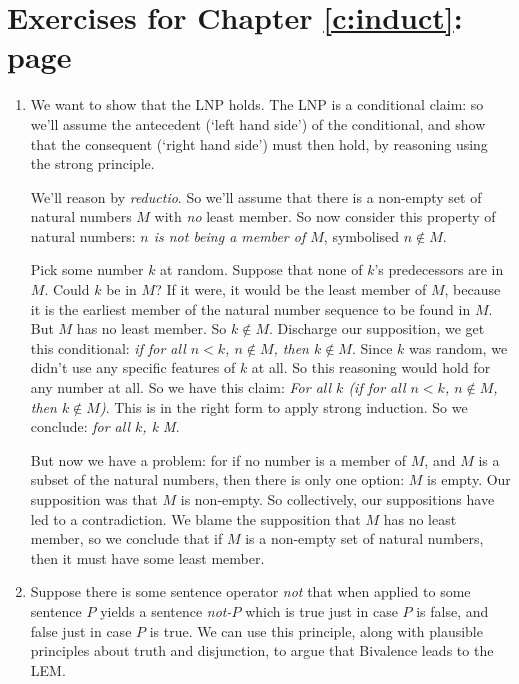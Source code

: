 
\section*{Exercises for Chapter \ref{c:induct}: page \pageref{ex:induct}} \label{ans:induct}

{\small
\begin{enumerate}
	\item We want to show that the LNP holds. The LNP is a conditional claim: so we'll assume the antecedent (`left hand side') of the conditional, and show that the consequent (`right hand side') must then hold, by reasoning using the strong principle.

	We'll reason by \emph{reductio}. So we'll assume that there is a non-empty set of natural numbers $M$ with \emph{no} least member. So now consider this property of natural numbers: \emph{$n$ is not being a member of $M$}, symbolised $n \notin M$.

	Pick some number $k$ at random. Suppose that none of $k$'s  predecessors are in $M$. Could $k$ be in $M$? If it were, it would be the least member of $M$, because it is the earliest member of the natural number sequence to be found in $M$. But $M$ has no least member. So $k\notin M$. Discharge our supposition, we get this conditional: \emph{if for all $n<k$, $n\notin M$, then $k\notin M$}. Since $k$ was random, we didn't use any specific features of $k$ at all. So this reasoning would hold for any number at all. So we have this claim: \emph{For all $k$ (if for all $n<k$, $n\notin M$, then $k\notin M$)}. This is in the right form to apply strong induction. So we conclude: \emph{for all $k$, k \notin M}.

	But now we have a problem: for if no number is a member of $M$, and $M$ is a subset of the natural numbers, then there is only one option: $M$ is empty. Our supposition was that $M$ is non-empty. So collectively,  our suppositions have led to a contradiction. We blame the supposition that $M$ has no least member, so we conclude that if $M$ is a non-empty set of natural numbers, then it must have some least member.

	 \item  Suppose there is some sentence operator \emph{not} that when applied to some sentence $P$ yields a sentence \emph{not-$P$} which is true just in case $P$ is false, and false just in case $P$ is true. We can use this principle, along with plausible principles about truth and disjunction, to argue that Bivalence leads to the LEM.


\end{enumerate}}
